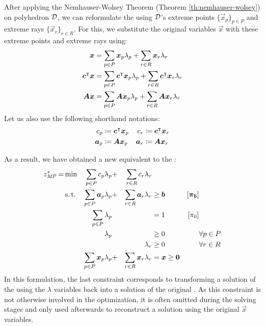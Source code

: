 After applying the Nemhauser-Wolsey Theorem (Theorem \ref{th:nemhauser-wolsey}) on polyhedron $\mathcal{D}$, we can reformulate the \LP{} using $\mathcal{D}$'s extreme points $\{\vec{x}_p\}_{p \in P}$ and extreme rays $\{\vec{x}_r\}_{r \in R}$. For this, we substitute the original variables $\vec{x}$ with these extreme points and extreme rays using:
\begin{equation}
\begin{aligned}
{\bm{x}} &= \sum_{p \in P} {\bm{x}}_p \lambda_p + \sum_{r \in R} {\bm{x}}_r \lambda_r \\
{\bm{c}}^\intercal {\bm{x}} &= \sum_{p \in P} {\bm{c}}^\intercal {\bm{x}}_p \lambda_p + \sum_{r \in R} {\bm{c}}^\intercal {\bm{x}}_r \lambda_r \\
{\bm{A}} {\bm{x}} &= \sum_{p \in P} {\bm{A}} {\bm{x}}_p \lambda_p + \sum_{r \in R} {\bm{A}} {\bm{x}}_r \lambda_r
\end{aligned}
\end{equation}
Let us also use the following shorthand notations:
\begin{equation}
\begin{aligned}
c_p &\coloneqq {\bm{c}}^\intercal {\bm{x}}_p
&c_r &\coloneqq {\bm{c}}^\intercal {\bm{x}}_r \\
{\bm{a}}_p &\coloneqq {\bm{A}} {\bm{x}}_p
&{\bm{a}}_r &\coloneqq {\bm{A}} {\bm{x}}_r
\end{aligned}
\end{equation}

As a result, we have obtained a new \MP{} equivalent to the \LP{}:
\begin{equation}
\begin{aligned}
z^*_{\textit{MP}}{} = &\min & \sum_{p \in P} c_p \lambda_p &+ &\sum_{r \in R} c_r \lambda_r & & & \\
&\operatorname{s.t.} & \sum_{p \in P} {\bm{a}}_p \lambda_p &+ &\sum_{r \in R} {\bm{a}}_r \lambda_r & \geq {\bm{b}} & \left[{\bm{\pi}}_{\bm{b}}\right] \\
&& \sum_{p \in P} \lambda_p & & & = 1 & \left[\pi_0 \right] & \\
&& \lambda_p & & & \geq 0 & & \forall p \in P \\
&& & & \lambda_r & \geq 0 & & \forall r \in R \\
&& \sum_{p \in P} {\bm{x}}_p \lambda_p &+ &\sum_{r \in R} {\bm{x}}_r \lambda_r & = {\bm{x}} \geq {\bm{0}} & &
\end{aligned}
\end{equation}
In this formulation, the last constraint corresponds to transforming a solution of the \MP{} using the $\lambda$ variables back into a solution of the original \LP{}. As this constraint is not otherwise involved in the optimization, it is often omitted during the solving stages and only used afterwards to reconstruct a solution using the original $\vec{x}$ variables.


